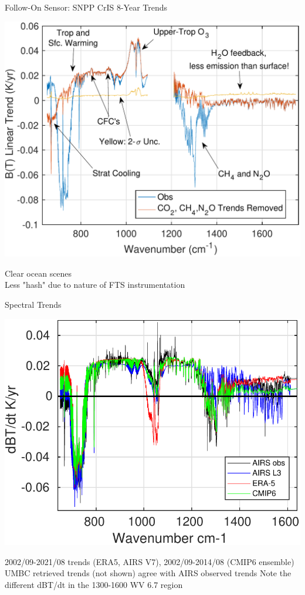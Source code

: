 \documentclass[10pt,t]{beamer}
\begin{document}
\begin{frame}{Follow-On Sensor: SNPP CrIS 8-Year Trends}
\begin{center}
\includegraphics[width=0.8\linewidth]{SunClimate2022/cris_dbt_clear_all_lats_lwmw_annotated.pdf}
\end{center}
\vspace{-0.1in}
\footnotesize Clear ocean scenes \\
\footnotesize Less "hash" due to nature of FTS instrumentation
\end{frame}
\begin{frame}{Spectral Trends}
\begin{center}
\includegraphics[width=0.75\linewidth]{NEWFIGS/model_vs_obs_BTtrends.pdf}
\end{center}
\footnotesize 2002/09-2021/08 trends (ERA5, AIRS V7), 2002/09-2014/08 (CMIP6 ensemble) \newline
\footnotesize UMBC retrieved trends (not shown) agree with AIRS observed trends \newline
\footnotesize Note the different dBT/dt in the 1300-1600 \wn WV 6.7 \um region
\end{frame}
\end{document}
